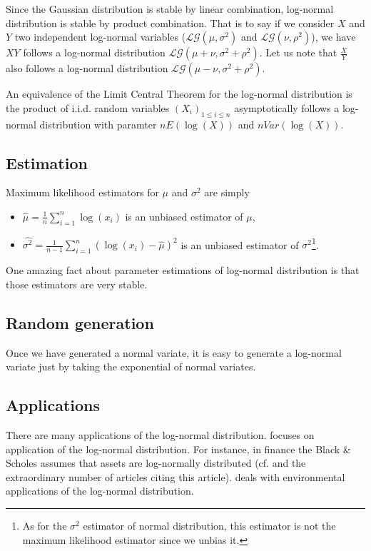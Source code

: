 Since the Gaussian distribution is stable by linear combination, log-normal distribution is stable by product combination. That is to say if we consider $X$ and $Y$ two independent log-normal variables ($\mathcal L \mathcal G(\mu,\sigma^2)$ and $\mathcal L \mathcal G(\nu,\rho^2)$),
we have $XY$ follows a log-normal distribution $\mathcal L \mathcal G(\mu+\nu,\sigma^2+\rho^2)$.
Let us note that $\frac{X}{Y}$ also follows a log-normal distribution $\mathcal L \mathcal G(\mu-\nu,\sigma^2+\rho^2)$.

An equivalence of the Limit Central Theorem for the log-normal distribution is the product of i.i.d. random variables $(X_i)_{1\leq i\leq n}$ asymptotically follows a log-normal distribution with paramter $n E(\log(X))$ and $n Var(\log(X))$.

\subsection{Estimation}
Maximum likelihood estimators for $\mu$ and $\sigma^2$ are simply
\begin{itemize}
\item $\hat \mu = \frac{1}{n} \sum_{i=1}^n\log(x_i)$ is an unbiased estimator of $\mu$,
\item $\widehat{\sigma^2} = \frac{1}{n-1} \sum_{i=1}^n (\log(x_i)- \hat \mu)^2$ is an unbiased estimator of $\sigma^2$\footnote{As for the $\sigma^2$ estimator of normal distribution, this estimator is not the maximum likelihood estimator since we unbias it.}.
\end{itemize}
One amazing fact about parameter estimations of log-normal distribution is that those estimators are very stable. 

\subsection{Random generation}
Once we have generated a normal variate, it is easy to generate a log-normal variate just by taking the exponential of normal variates.

\subsection{Applications}
There are many applications of the log-normal distribution. \cite{logappli} focuses on application of the log-normal distribution. For instance, in finance the Black \& Scholes assumes that assets are log-normally distributed (cf. \cite{blackscholes73} and the extraordinary number of articles citing this article).
\cite{biolognorm} deals with environmental applications of the log-normal distribution.



